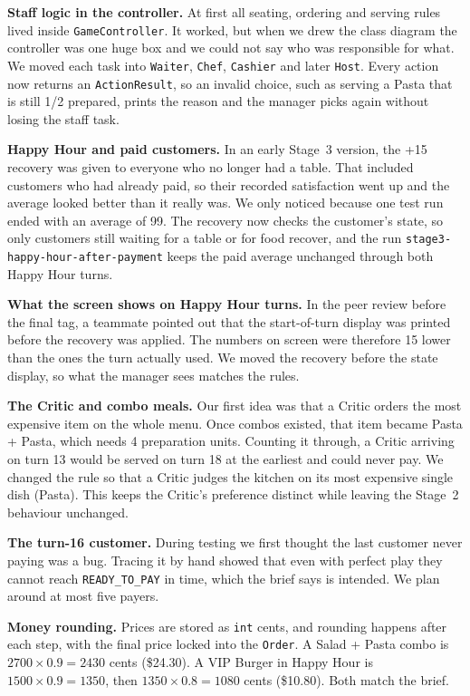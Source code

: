 \textbf{Staff logic in the controller.} At first all seating, ordering and serving rules lived inside \texttt{GameController}. It worked, but when we drew the class diagram the controller was one huge box and we could not say who was responsible for what. We moved each task into \texttt{Waiter}, \texttt{Chef}, \texttt{Cashier} and later \texttt{Host}. Every action now returns an \texttt{ActionResult}, so an invalid choice, such as serving a Pasta that is still 1/2 prepared, prints the reason and the manager picks again without losing the staff task.

\textbf{Happy Hour and paid customers.} In an early Stage~3 version, the +15 recovery was given to everyone who no longer had a table. That included customers who had already paid, so their recorded satisfaction went up and the average looked better than it really was. We only noticed because one test run ended with an average of 99. The recovery now checks the customer's state, so only customers still waiting for a table or for food recover, and the run \texttt{stage3-happy-hour-after-payment} keeps the paid average unchanged through both Happy Hour turns.

\textbf{What the screen shows on Happy Hour turns.} In the peer review before the final tag, a teammate pointed out that the start-of-turn display was printed before the recovery was applied. The numbers on screen were therefore 15 lower than the ones the turn actually used. We moved the recovery before the state display, so what the manager sees matches the rules.

\textbf{The Critic and combo meals.} Our first idea was that a Critic orders the most expensive item on the whole menu. Once combos existed, that item became Pasta + Pasta, which needs 4 preparation units. Counting it through, a Critic arriving on turn 13 would be served on turn 18 at the earliest and could never pay. We changed the rule so that a Critic judges the kitchen on its most expensive single dish (Pasta). This keeps the Critic's preference distinct while leaving the Stage~2 behaviour unchanged.

\textbf{The turn-16 customer.} During testing we first thought the last customer never paying was a bug. Tracing it by hand showed that even with perfect play they cannot reach \texttt{READY\_TO\_PAY} in time, which the brief says is intended. We plan around at most five payers.

\textbf{Money rounding.} Prices are stored as \texttt{int} cents, and rounding happens after each step, with the final price locked into the \texttt{Order}. A Salad + Pasta combo is $2700 \times 0.9 = 2430$ cents (\$24.30). A VIP Burger in Happy Hour is $1500 \times 0.9 = 1350$, then $1350 \times 0.8 = 1080$ cents (\$10.80). Both match the brief.

